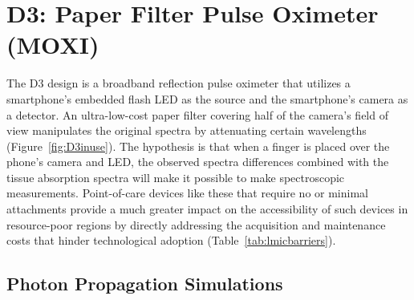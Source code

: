 \section{D3: Paper Filter Pulse Oximeter (MOXI)}
The D3 design is a broadband reflection pulse oximeter that utilizes a smartphone's embedded flash \ac{LED} as the source and the smartphone's camera as a detector. An ultra-low-cost paper filter covering half of the camera's field of view manipulates the original spectra by attenuating certain wavelengths (Figure~\ref{fig:D3inuse}). The hypothesis is that when a finger is placed over the phone's camera and \ac{LED}, the observed spectra differences combined with the tissue absorption spectra will make it possible to make spectroscopic measurements. Point-of-care devices like these that require no or minimal attachments provide a much greater impact on the accessibility of such devices in resource-poor regions by directly addressing the acquisition and maintenance costs that hinder technological adoption (Table~\ref{tab:lmicbarriers}).

\subsection{Photon Propagation Simulations}
